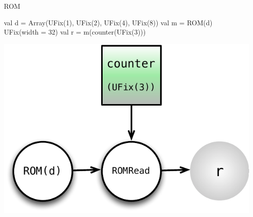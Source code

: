 \documentclass[xcolor=pdflatex,dvipsnames,table]{beamer}
\begin{document}
\begin{frame}[fragile]{ROM}

\begin{scala}
val d = Array(UFix(1), UFix(2), UFix(4), UFix(8))
val m = ROM(d){ UFix(width = 32) }
val r = m(counter(UFix(3)))
\end{scala}

\begin{center}
\includegraphics[height=0.7\textheight]{figs/rom.pdf} 
\end{center}

\end{frame}
\end{document}
